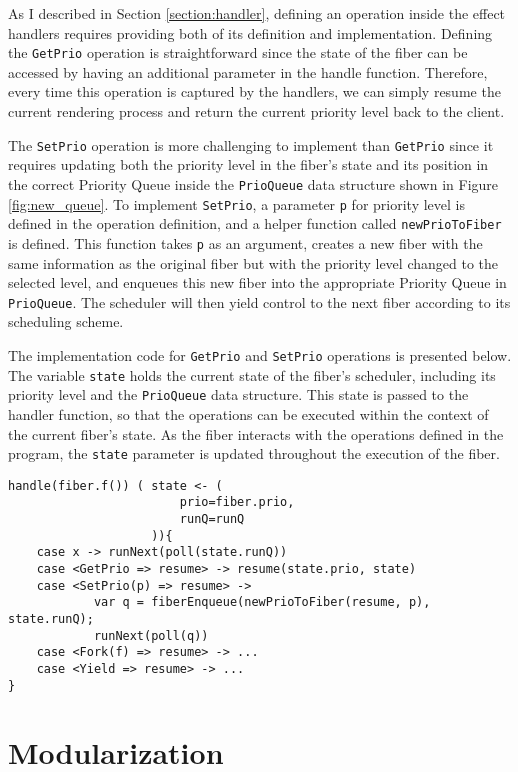 \documentclass[logo,bsc,singlespacing,parskip]{infthesis}
\begin{document}
As I described in Section \ref{section:handler}, defining an operation inside the effect handlers requires providing both of its definition and implementation. Defining the \texttt{GetPrio} operation is straightforward since the state of the fiber can be accessed by having an additional parameter in the handle function. Therefore, every time this operation is captured by the handlers, we can simply resume the current rendering process and return the current priority level back to the client.

The \texttt{SetPrio} operation is more challenging to implement than \texttt{GetPrio} since it requires updating both the priority level in the fiber's state and its position in the correct Priority Queue inside the \texttt{PrioQueue} data structure shown in Figure \ref{fig:new_queue}. To implement \texttt{SetPrio}, a parameter \texttt{p} for priority level is defined in the operation definition, and a helper function called \texttt{newPrioToFiber} is defined. This function takes \texttt{p} as an argument, creates a new fiber with the same information as the original fiber but with the priority level changed to the selected level, and enqueues this new fiber into the appropriate Priority Queue in \texttt{PrioQueue}. The scheduler will then yield control to the next fiber according to its scheduling scheme.

The implementation code for \texttt{GetPrio} and \texttt{SetPrio} operations is presented below. The variable \texttt{state} holds the current state of the fiber's scheduler, including its priority level and the \texttt{PrioQueue} data structure. This state is passed to the handler function, so that the operations can be executed within the context of the current fiber's state. As the fiber interacts with the operations defined in the program, the \texttt{state} parameter is updated throughout the execution of the fiber.

\begin{verbatim}
handle(fiber.f()) ( state <- (
                        prio=fiber.prio, 
                        runQ=runQ
                    )){
    case x -> runNext(poll(state.runQ))
    case <GetPrio => resume> -> resume(state.prio, state)
    case <SetPrio(p) => resume> -> 
            var q = fiberEnqueue(newPrioToFiber(resume, p), state.runQ);
            runNext(poll(q))
    case <Fork(f) => resume> -> ...
    case <Yield => resume> -> ...
}
\end{verbatim}

\section{Modularization}
\label{section:modularization}
\end{document}
